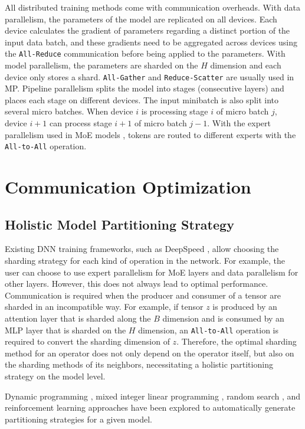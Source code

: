 \documentclass[a4paper, 11pt]{article}
\begin{document}
    All distributed training methods come with communication overheads. With data parallelism, the parameters of the
    model are replicated on all devices. Each device calculates the gradient of parameters regarding a distinct portion
    of the input data batch, and these gradients need to be aggregated across devices using the \texttt{All-Reduce}
    communication before being applied to the parameters. With model parallelism, the parameters are sharded on the $H$
    dimension and each device only stores a shard. \texttt{All-Gather} and \texttt{Reduce-Scatter} are usually used in
    MP. Pipeline parallelism splits the model into stages (consecutive layers) and places each stage on different
    devices. The input minibatch is also split into several micro batches. When device $i$ is processing stage $i$ of
    micro batch $j$, device $i+1$ can process stage $i+1$ of micro batch $j-1$. With the expert parallelism used in MoE
    models \cite{gshard}, tokens are routed to different experts with the \texttt{All-to-All} operation.


    \section{Communication Optimization}

    \subsection{Holistic Model Partitioning Strategy}

    Existing DNN training frameworks, such as DeepSpeed \cite{deepspeed}, allow choosing the sharding strategy for each
    kind of operation in the network. For example, the user can choose to use expert parallelism for MoE layers and data
    parallelism for other layers. However, this does not always lead to optimal performance. Communication is required
    when the producer and consumer of a tensor are sharded in an incompatible way. For example, if tensor $z$ is
    produced by an attention layer that is sharded along the $B$ dimension and is consumed by an MLP layer that is
    sharded on the $H$ dimension, an \texttt{All-to-All} operation is required to convert the sharding dimension of $z$.
    Therefore, the optimal sharding method for an operator does not only depend on the operator itself, but also on the
    sharding methods of its neighbors, necessitating a holistic partitioning strategy on the model level.

    Dynamic programming \cite{tofu,hypar,hidup}, mixed integer linear programming \cite{alpa}, random search
    \cite{flexflow,unity}, and reinforcement learning \cite{heterog,gdp} approaches have been explored to automatically
    generate partitioning strategies for a given model.
\end{document}
